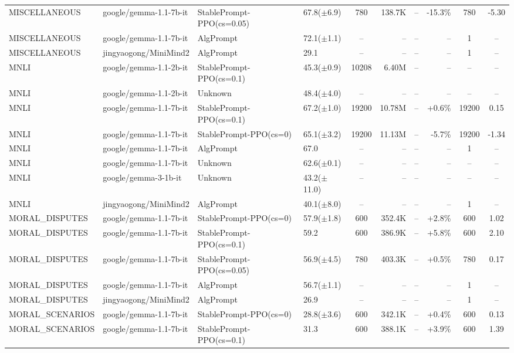 {\begin{longtable}{@{}p{5.5cm}p{4.5cm}p{2.5cm}lcrrrcc@{}}
MISCELLANEOUS & google/gemma-1.1-7b-it & StablePrompt-PPO(cs=0.05) & 67.8($\pm$6.9) & 780 & 138.7K & -- & -15.3\% & 780 & -5.30 \\
MISCELLANEOUS & google/gemma-1.1-7b-it & AlgPrompt & 72.1($\pm$1.1) & -- & -- & -- & -- & 1 & -- \\
\midrule
MISCELLANEOUS & jingyaogong/MiniMind2 & AlgPrompt & 29.1 & -- & -- & -- & -- & 1 & -- \\
\midrule
MNLI & google/gemma-1.1-2b-it & StablePrompt-PPO(cs=0.1) & 45.3($\pm$0.9) & 10208 & 6.40M & -- & -- & -- & -- \\
MNLI & google/gemma-1.1-2b-it & Unknown & 48.4($\pm$4.0) & -- & -- & -- & -- & -- & -- \\
\midrule
MNLI & google/gemma-1.1-7b-it & StablePrompt-PPO(cs=0.1) & 67.2($\pm$1.0) & 19200 & 10.78M & -- & +0.6\% & 19200 & 0.15 \\
MNLI & google/gemma-1.1-7b-it & StablePrompt-PPO(cs=0) & 65.1($\pm$3.2) & 19200 & 11.13M & -- & -5.7\% & 19200 & -1.34 \\
MNLI & google/gemma-1.1-7b-it & AlgPrompt & 67.0 & -- & -- & -- & -- & 1 & -- \\
MNLI & google/gemma-1.1-7b-it & Unknown & 62.6($\pm$0.1) & -- & -- & -- & -- & -- & -- \\
\midrule
MNLI & google/gemma-3-1b-it & Unknown & 43.2($\pm$11.0) & -- & -- & -- & -- & -- & -- \\
\midrule
MNLI & jingyaogong/MiniMind2 & AlgPrompt & 40.1($\pm$8.0) & -- & -- & -- & -- & 1 & -- \\
\midrule
MORAL\_DISPUTES & google/gemma-1.1-7b-it & StablePrompt-PPO(cs=0) & 57.9($\pm$1.8) & 600 & 352.4K & -- & +2.8\% & 600 & 1.02 \\
MORAL\_DISPUTES & google/gemma-1.1-7b-it & StablePrompt-PPO(cs=0.1) & 59.2 & 600 & 386.9K & -- & +5.8\% & 600 & 2.10 \\
MORAL\_DISPUTES & google/gemma-1.1-7b-it & StablePrompt-PPO(cs=0.05) & 56.9($\pm$4.5) & 780 & 403.3K & -- & +0.5\% & 780 & 0.17 \\
MORAL\_DISPUTES & google/gemma-1.1-7b-it & AlgPrompt & 56.7($\pm$1.1) & -- & -- & -- & -- & 1 & -- \\
\midrule
MORAL\_DISPUTES & jingyaogong/MiniMind2 & AlgPrompt & 26.9 & -- & -- & -- & -- & 1 & -- \\
\midrule
MORAL\_SCENARIOS & google/gemma-1.1-7b-it & StablePrompt-PPO(cs=0) & 28.8($\pm$3.6) & 600 & 342.1K & -- & +0.4\% & 600 & 0.13 \\
MORAL\_SCENARIOS & google/gemma-1.1-7b-it & StablePrompt-PPO(cs=0.1) & 31.3 & 600 & 388.1K & -- & +3.9\% & 600 & 1.39 \\

\end{longtable}}
